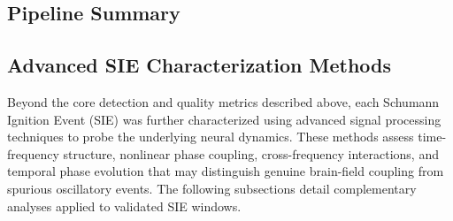 \documentclass[11pt,a4paper]{article}
\begin{document}
\subsection{Pipeline Summary}
\begin{table}[H]
    \centering
     \end{table}

\subsection{Advanced SIE Characterization Methods}
Beyond the core detection and quality metrics described above, each Schumann Ignition Event (SIE) was further characterized using advanced signal processing techniques to probe the underlying neural dynamics. These methods assess time-frequency structure, nonlinear phase coupling, cross-frequency interactions, and temporal phase evolution that may distinguish genuine brain-field coupling from spurious oscillatory events. The following subsections detail complementary analyses applied to validated SIE windows.
\end{document}
